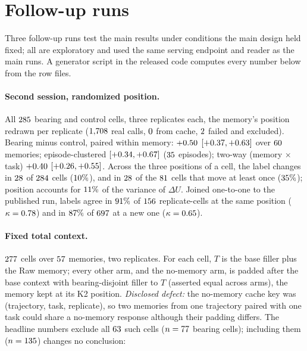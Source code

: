 \section{Follow-up runs}
\label{sec:sophia}
Three follow-up runs test the main results under conditions the main design
held fixed; all are exploratory and used the same serving endpoint and reader as
the main runs. A generator script in the released code computes every number
below from the row files.

\paragraph{Second session, randomized position.} All $285$ bearing and
control cells, three replicates each, the memory's position redrawn per
replicate ($1{,}708$ real calls, $0$ from cache,
$2$ failed and excluded). Bearing minus control, paired within memory:
$+0.50$ $[+0.37, +0.63]$ over $60$ memories;
episode-clustered $[+0.34, +0.67]$ ($35$ episodes); two-way
(memory $\times$ task) $+0.40$ $[+0.26, +0.55]$. Across the
three positions of a cell, the label changes in $28$ of $284$
cells ($10\%$), and in $28$ of the $81$ cells that move
at least once ($35\%$); position accounts for $11\%$ of
the variance of $\Delta U$. Joined one-to-one to the published run, labels agree
in $91\%$ of $156$ replicate-cells at the same position
($\kappa = 0.78$) and in $87\%$ of $697$ at a new
one ($\kappa = 0.65$).

\paragraph{Fixed total context.} $277$ cells over $57$
memories, two replicates. For each cell, $T$ is the base filler plus the Raw
memory; every other arm, and the no-memory arm, is padded after the base context
with bearing-disjoint filler to $T$ (asserted equal across arms), the memory
kept at its K2 position. \emph{Disclosed defect:} the no-memory cache key was
(trajectory, task, replicate), so two memories from one trajectory paired with
one task could share a no-memory response although their padding differs. The
headline numbers exclude all $63$ such cells ($n=77$ bearing
cells); including them ($n=135$) changes no conclusion:

